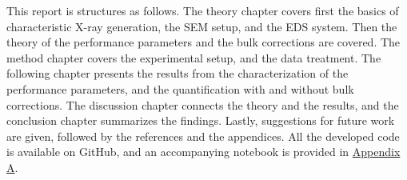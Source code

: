This report is structures as follows. 
The theory chapter covers first the basics of characteristic X-ray generation, the SEM setup, and the EDS system.
Then the theory of the performance parameters and the bulk corrections are covered.
The method chapter covers the experimental setup, and the data treatment.
The following chapter presents the results from the characterization of the performance parameters, and the quantification with and without bulk corrections.
The discussion chapter connects the theory and the results, and the conclusion chapter summarizes the findings.
Lastly, suggestions for future work are given, followed by the references and the appendices.
All the developed code is available on GitHub, and an accompanying notebook is provided in \hyperref[appendix:performance]{Appendix A}.









